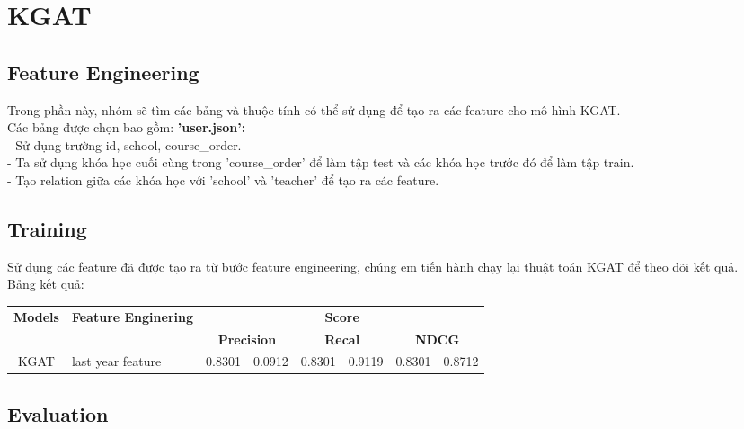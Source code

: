 \section{KGAT}
\subsection{Feature Engineering}
Trong phần này, nhóm sẽ tìm các bảng và thuộc tính có thể sử dụng để tạo ra các feature cho mô hình KGAT.\\
Các bảng được chọn bao gồm:
\textbf{'user.json':} \\
- Sử dụng trường id, school, course\_order. \\
- Ta sử dụng khóa học cuối cùng trong 'course\_order' để làm tập test và các khóa học trước đó để làm tập train.\\
- Tạo relation giữa các khóa học với 'school' và 'teacher' để tạo ra các feature.\\
\subsection{Training}
Sử dụng các feature đã được tạo ra từ bước feature engineering, chúng em tiến hành chạy lại thuật toán KGAT để theo dõi kết quả.\\
Bảng kết quả:
\begin{table}[h]
    \begin{tabular}{ccclllll}
    \hline
    \multirow{2}{*}{\textbf{Models}} &
      \multirow{2}{*}{\textbf{Feature Enginering}} &
      \multicolumn{6}{c}{\textbf{Score}} \\ \cline{3-8} 
     &
       &
      \multicolumn{2}{c}{\textbf{Precision}} &
      \multicolumn{2}{c}{\textbf{Recal}} &
      \multicolumn{2}{c}{\textbf{NDCG}} \\ \hline
    KGAT &
      \multicolumn{1}{l}{last year feature} &
      \multicolumn{1}{l}{0.8301} &
      0.0912 &
      0.8301 &
      0.9119 &
      0.8301 &
      0.8712
\end{tabular}
\end{table}
\subsection{Evaluation}